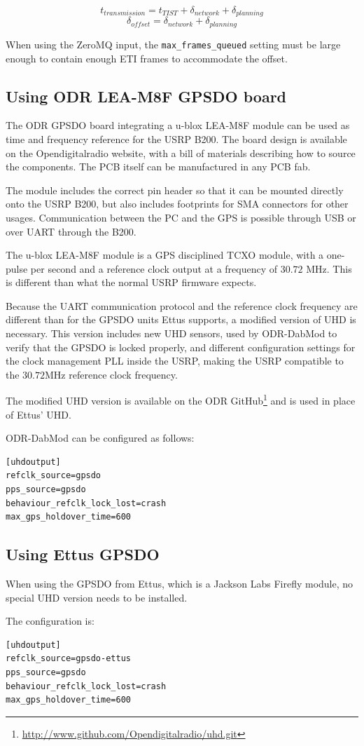\[
    t_{transmission} = t_{TIST} + \delta_{network} + \delta_{planning}
\]
\[
    \delta_{offset} = \delta_{network} + \delta_{planning}
\]

When using the ZeroMQ input, the \verb+max_frames_queued+ setting must be
large enough to contain enough ETI frames to accommodate the offset.

\subsection{Using ODR LEA-M8F GPSDO board}

The ODR GPSDO board integrating a u-blox LEA-M8F module can be used as time and
frequency reference for the USRP B200. 
The board design is available on the Opendigitalradio website, with
a bill of materials describing how to source the components. The PCB itself can
be manufactured in any PCB fab.

The module includes the correct pin header so that it can be mounted directly
onto the USRP B200, but also includes footprints for SMA connectors for other
usages. Communication between the PC and the GPS is possible through USB or over
UART through the B200.

The u-blox LEA-M8F module is a GPS disciplined TCXO module, with a one-pulse per
second and a reference clock output at a frequency of $30.72$ MHz. This is
different than what the normal USRP firmware expects.

Because the UART communication protocol and the reference clock frequency are
different than for the GPSDO units Ettus supports, a modified version of UHD is
necessary. This version includes new UHD sensors, used by ODR-DabMod to verify
that the GPSDO is locked properly, and different configuration settings for the
clock management PLL inside the USRP, making the USRP compatible to the
$30.72$MHz reference clock frequency.

The modified UHD version is available on the ODR GitHub\footnote{
    \url{http://www.github.com/Opendigitalradio/uhd.git}} and is used in place
of Ettus' UHD.

ODR-DabMod can be configured as follows:
\begin{lstlisting}
[uhdoutput]
refclk_source=gpsdo
pps_source=gpsdo
behaviour_refclk_lock_lost=crash
max_gps_holdover_time=600
\end{lstlisting}


\subsection{Using Ettus GPSDO}
When using the GPSDO from Ettus, which is a Jackson Labs Firefly module, no
special UHD version needs to be installed.

The configuration is:
\begin{lstlisting}
[uhdoutput]
refclk_source=gpsdo-ettus
pps_source=gpsdo
behaviour_refclk_lock_lost=crash
max_gps_holdover_time=600
\end{lstlisting}

